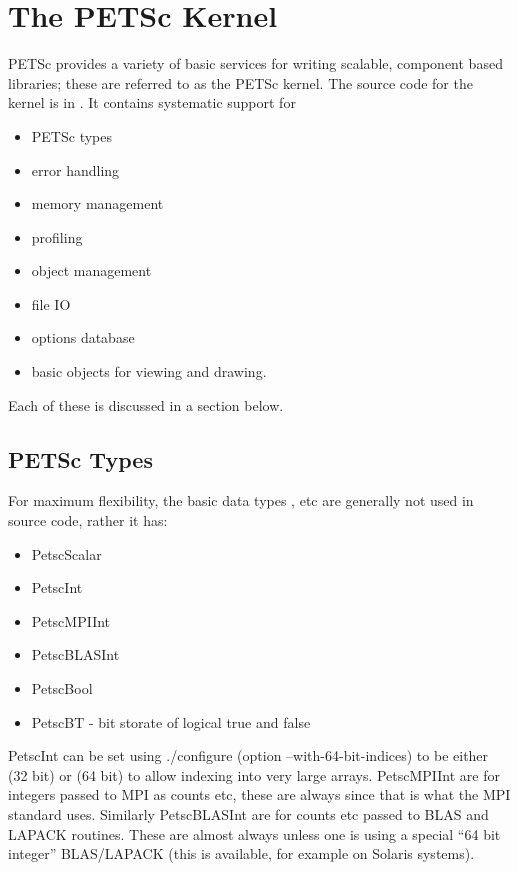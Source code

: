 \documentclass[twoside,12pt]{../sty/report_petsc}
\begin{document}
\chapter{The PETSc Kernel}
\label{chapter:kernel}
PETSc provides a variety of basic services for writing scalable, component
based libraries; these are referred to as the PETSc kernel. The source
code for the kernel is in . It contains systematic support for
\begin{itemize}
  \item PETSc types
  \item error handling
  \item memory management
  \item profiling
  \item object management
  \item file IO
  \item options database
  \item basic objects for viewing and drawing.
\end{itemize}
Each of these is discussed in a section below.

\section{PETSc Types}
For maximum flexibility, the basic data types ,  etc are
generally not used in source code, rather it has:
\begin{itemize}
  \item PetscScalar
  \item PetscInt
  \item PetscMPIInt
  \item PetscBLASInt
  \item PetscBool
  \item PetscBT  - bit storate of logical true and false
\end{itemize}
PetscInt can be set using ./configure (option --with-64-bit-indices) to be either  (32 bit) or 
(64 bit)
to allow indexing into very large arrays. PetscMPIInt are for integers passed to MPI
as counts etc, these are always  since that is what the MPI standard uses. Similarly
PetscBLASInt are for counts etc passed to BLAS and LAPACK routines. These are almost always
 unless one is using a special ``64 bit integer'' BLAS/LAPACK (this is available, for
example on Solaris systems).
\end{document}
